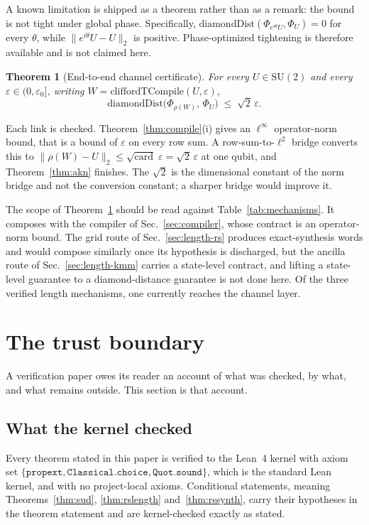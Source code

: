 \documentclass[aps,pra,reprint,nofootinbib,superscriptaddress]{revtex4-2}
\newcommand{\su}[1]{\mathrm{SU}(#1)}
\newcommand{\opn}[1]{\lVert #1 \rVert}
\theoremstyle{plain}
\newtheorem{theorem}{Theorem}
\theoremstyle{definition}
\begin{document}
A known limitation is shipped as a theorem rather than as a remark: the bound
is not tight under global phase. Specifically,
$\mathrm{diamondDist}(\Phi_{e^{i\theta}U}, \Phi_U) = 0$ for every $\theta$,
while $\opn{e^{i\theta}U - U}_2$ is positive. Phase-optimized tightening is
therefore available and is not claimed here.

\begin{theorem}[End-to-end channel certificate]
\label{thm:capstone}
For every $U \in \su 2$ and every $\varepsilon \in (0,\varepsilon_0]$, writing
$W = \mathrm{cliffordTCompile}(U,\varepsilon)$,
\[
  \mathrm{diamondDist}\big(\Phi_{\rho(W)},\, \Phi_U\big) \;\le\;
    \sqrt 2\,\varepsilon .
\]
\end{theorem}

Each link is checked. Theorem~\ref{thm:compile}(i) gives an $\ell^\infty$
operator-norm bound, that is a bound of $\varepsilon$ on every row sum. A
row-sum-to-$\ell^2$ bridge converts this to
$\opn{\rho(W) - U}_2 \le \sqrt{\mathrm{card}}\;\varepsilon = \sqrt 2\,\varepsilon$
at one qubit, and Theorem~\ref{thm:akn} finishes. The $\sqrt 2$ is the
dimensional constant of the norm bridge and not the conversion constant; a
sharper bridge would improve it.

The scope of Theorem~\ref{thm:capstone} should be read against
Table~\ref{tab:mechanisms}. It composes with the compiler of
Sec.~\ref{sec:compiler}, whose contract is an operator-norm bound. The grid
route of Sec.~\ref{sec:length-rs} produces exact-synthesis words and would
compose similarly once its hypothesis is discharged, but the ancilla route of
Sec.~\ref{sec:length-kmm} carries a state-level contract, and lifting a
state-level guarantee to a diamond-distance guarantee is not done here. Of the
three verified length mechanisms, one currently reaches the channel layer.

\section{The trust boundary}
\label{sec:trust}

A verification paper owes its reader an account of what was checked, by what,
and what remains outside. This section is that account.

\subsection{What the kernel checked}

Every theorem stated in this paper is verified to the Lean~4 kernel with axiom
set $\{\texttt{propext},\allowbreak \texttt{Classical.choice},\allowbreak
\texttt{Quot.sound}\}$, which is the standard Lean kernel, and with no
project-local axioms. Conditional statements, meaning Theorems~\ref{thm:sud},
\ref{thm:rslength} and~\ref{thm:rssynth}, carry their hypotheses in the theorem
statement and are kernel-checked exactly as stated.
\end{document}
